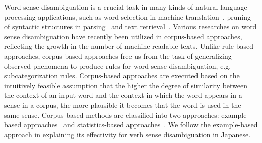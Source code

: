 Word sense disambiguation is a crucial task in many kinds of natural
language processing applications, such as word selection in machine
translation~\cite{brown:91}, pruning of syntactic structures in
parsing~\cite{lytinen:86,k.nagao:94} and text
retrieval~\cite{krovets:92,voorhees:93}.  Various researches on word
sense disambiguation have recently been utilized in corpus-based
approaches, reflecting the growth in the number of machine readable
texts.  Unlike rule-based approaches, corpus-based approaches free us
from the task of generalizing observed phenomena to produce rules for
word sense disambiguation, \hspace{-0.15mm}e.g.\hspace{-0.15mm} subcategorization \hspace{-0.15mm}rules. \hspace{-0.15mm}Corpus-based\hspace{-0.15mm} 
approaches\hspace{-0.15mm} are\hspace{-0.15mm} executed\hspace{-0.15mm} based\hspace{-0.15mm} on\hspace{-0.1mm} the\hspace{-0.1mm} intuitively\hspace{-0.1mm} feasible\hspace{-0.1mm} assumption
that\hspace{-0.1mm} the\hspace{-0.1mm} higher\hspace{-0.1mm} the\hspace{-0.1mm} degree\hspace{-0.1mm} of\hspace{-0.1mm} similarity\hspace{-0.1mm} between\hspace{-0.1mm} the\hspace{-0.1mm} context of an
input word and the context in which the word appears in a sense in a
corpus, the more plausible it becomes that the word is used in the
same sense.  Corpus-based methods are classified into two approaches:
example-based approaches~\cite{kurohashi:94,uramoto:94:a} and\hspace{-0.1mm}
statistics-based\hspace{-0.1mm} 
a\hspace{-0.1mm}pproaches\hspace{-0.1mm}~\cite{brown:91,dagan:94:a,niwa:94,schutze:92:a,yarowsky:95}.
We follow the example-based approach in explaining its effectivity for
verb sense disambiguation in Japanese.

